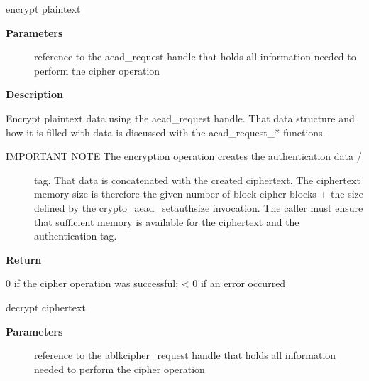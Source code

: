 \documentclass[a4paper,8pt,english]{sphinxmanual}
\begin{document}
\begin{fulllineitems}
\label{crypto/api-aead:c.crypto_aead_encrypt}
encrypt plaintext

\end{fulllineitems}


\textbf{Parameters}
\begin{description}
\item[{}] \leavevmode
reference to the aead\_request handle that holds all information
needed to perform the cipher operation

\end{description}

\textbf{Description}

Encrypt plaintext data using the aead\_request handle. That data structure
and how it is filled with data is discussed with the aead\_request\_*
functions.
\begin{description}
\item[{IMPORTANT NOTE The encryption operation creates the authentication data /}] \leavevmode
tag. That data is concatenated with the created ciphertext.
The ciphertext memory size is therefore the given number of
block cipher blocks + the size defined by the
crypto\_aead\_setauthsize invocation. The caller must ensure
that sufficient memory is available for the ciphertext and
the authentication tag.

\end{description}

\textbf{Return}

0 if the cipher operation was successful; \textless{} 0 if an error occurred

\begin{fulllineitems}
\label{crypto/api-aead:c.crypto_aead_decrypt}
decrypt ciphertext

\end{fulllineitems}


\textbf{Parameters}
\begin{description}
\item[{}] \leavevmode
reference to the ablkcipher\_request handle that holds all information
needed to perform the cipher operation

\end{description}
\end{document}
